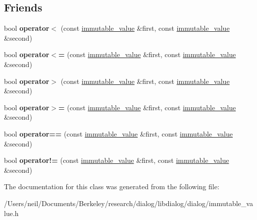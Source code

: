 \subsection*{Friends}
\begin{DoxyCompactItemize}
\item 
\mbox{\label{classdialog_1_1immutable__value_a223a5d3f8a4ab47c1a7055ff732f84ac}} 
bool {\bfseries operator$<$} (const \hyperlink{classdialog_1_1immutable__value}{immutable\+\_\+value} \&first, const \hyperlink{classdialog_1_1immutable__value}{immutable\+\_\+value} \&second)
\item 
\mbox{\label{classdialog_1_1immutable__value_ae3747864cc59a8767eb7065a4071ca2c}} 
bool {\bfseries operator$<$=} (const \hyperlink{classdialog_1_1immutable__value}{immutable\+\_\+value} \&first, const \hyperlink{classdialog_1_1immutable__value}{immutable\+\_\+value} \&second)
\item 
\mbox{\label{classdialog_1_1immutable__value_ac9bb357d3f926d85f8d27b06bf86bfa5}} 
bool {\bfseries operator$>$} (const \hyperlink{classdialog_1_1immutable__value}{immutable\+\_\+value} \&first, const \hyperlink{classdialog_1_1immutable__value}{immutable\+\_\+value} \&second)
\item 
\mbox{\label{classdialog_1_1immutable__value_adf272e27a6112206cbe677f5248866d1}} 
bool {\bfseries operator$>$=} (const \hyperlink{classdialog_1_1immutable__value}{immutable\+\_\+value} \&first, const \hyperlink{classdialog_1_1immutable__value}{immutable\+\_\+value} \&second)
\item 
\mbox{\label{classdialog_1_1immutable__value_aafc3d31ba21f46127b6579f33e7d8c2d}} 
bool {\bfseries operator==} (const \hyperlink{classdialog_1_1immutable__value}{immutable\+\_\+value} \&first, const \hyperlink{classdialog_1_1immutable__value}{immutable\+\_\+value} \&second)
\item 
\mbox{\label{classdialog_1_1immutable__value_ae99b9a91c1d64387aca36c1b2c1d67b1}} 
bool {\bfseries operator!=} (const \hyperlink{classdialog_1_1immutable__value}{immutable\+\_\+value} \&first, const \hyperlink{classdialog_1_1immutable__value}{immutable\+\_\+value} \&second)
\end{DoxyCompactItemize}


The documentation for this class was generated from the following file\+:\begin{DoxyCompactItemize}
\item 
/\+Users/neil/\+Documents/\+Berkeley/research/dialog/libdialog/dialog/immutable\+\_\+value.\+h\end{DoxyCompactItemize}
